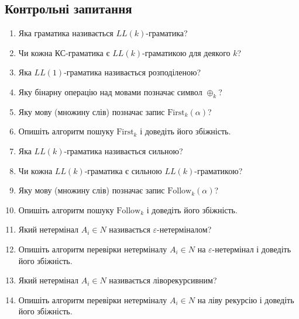\subsection{Контрольні запитання}
\begin{enumerate}
	\item Яка граматика називається $LL(k)$-граматика? %
	\item Чи кожна КС-граматика є $LL(k)$-граматикою для деякого $k$? %
	\item Яка $LL(1)$-граматика називається розподіленою? %
	\item Яку бінарну операцію над мовами позначає символ $\oplus_k$? %
	\item Яку мову (множину слів) позначає запис $\text{First}_k(\alpha)$? %
	\item Опишіть алгоритм пошуку $\text{First}_k$ і доведіть його збіжність.
	\item Яка $LL(k)$-граматика називається сильною? %
	\item Чи кожна $LL(k)$-граматика є сильною $LL(k)$-граматикою? %
	\item Яку мову (множину слів) позначає запис $\text{Follow}_k(\alpha)$? %
	\item Опишіть алгоритм пошуку $\text{Follow}_k$ і доведіть його збіжність.
	\item Який нетермінал $A_i \in N$ називається $\varepsilon$-нетерміналом? %
	\item Опишіть алгоритм перевірки нетерміналу $A_i \in N$ на $\varepsilon$-нетермінал і доведіть його збіжність.
	\item Який нетермінал $A_i \in N$ називається ліворекурсивним? %
	\item Опишіть алгоритм перевірки нетерміналу $A_i \in N$ на ліву рекурсію і доведіть його збіжність.
\end{enumerate}
